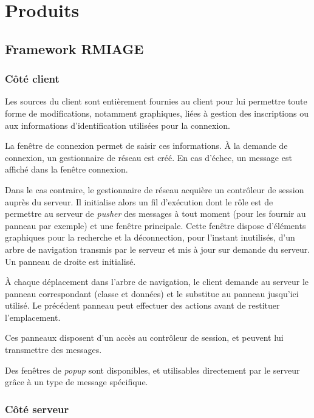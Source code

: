 \section{Produits}
\subsection{Framework RMIAGE}

\subsubsection{Côté client} %
\label{ssub:côté_client}
Les sources du client sont entièrement fournies au client pour lui permettre toute forme de modifications, notamment graphiques, liées à gestion des inscriptions ou aux informations d'identification utilisées pour la connexion.

La fenêtre de connexion permet de saisir ces informations. À la demande de connexion, un gestionnaire de réseau est créé. En cas d'échec, un message est affiché dans la fenêtre connexion.

Dans le cas contraire, le gestionnaire de réseau acquière un contrôleur de session auprès du serveur. Il initialise alors un fil d'exécution dont le rôle est de permettre au serveur de \emph{pusher} des messages à tout moment (pour les fournir au panneau par exemple) et une fenêtre principale. Cette fenêtre dispose d'éléments graphiques pour la recherche et la déconnection, pour l'instant inutilisés, d'un arbre de navigation transmis par le serveur et mis à jour sur demande du serveur. Un panneau de droite est initialisé.

À chaque déplacement dans l'arbre de navigation, le client demande au serveur le panneau correspondant (classe et données) et le substitue au panneau jusqu'ici utilisé. Le précédent panneau peut effectuer des actions avant de restituer l'emplacement.

Ces panneaux disposent d'un accès au contrôleur de session, et peuvent lui transmettre des messages.

Des fenêtres de \emph{popup} sont disponibles, et utilisables directement par le serveur grâce à un type de message spécifique.

\subsubsection{Côté serveur} %
\label{ssub:côté_serveur}

